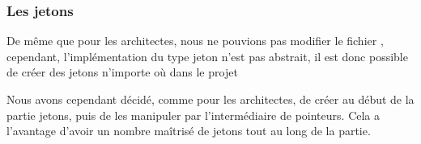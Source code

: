 
\subsubsection{Les jetons}
\label{tokens}

De même que pour les architectes, nous ne pouvions pas modifier le fichier , cependant, l'implémentation du type jeton n'est pas abstrait, il est donc possible de créer des jetons n'importe où dans le projet

Nous avons cependant décidé, comme pour les architectes, de créer au début de la partie  jetons, puis de les manipuler par l'intermédiaire de pointeurs. Cela a l'avantage d'avoir un nombre maîtrisé de jetons tout au long de la partie.


